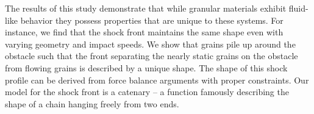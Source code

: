 The results of this study demonstrate that while granular materials exhibit fluid-like behavior they possess properties that are unique to these systems. For instance, we find that the shock front maintains the same shape even with varying geometry and impact speeds. We show that grains pile up around the obstacle such that the front separating the nearly static grains on the obstacle from flowing grains is described by a unique shape. The shape of this shock profile can be derived from force balance arguments with proper constraints. Our model for the shock front is a catenary – a function famously describing the shape of a chain hanging freely from two ends.
